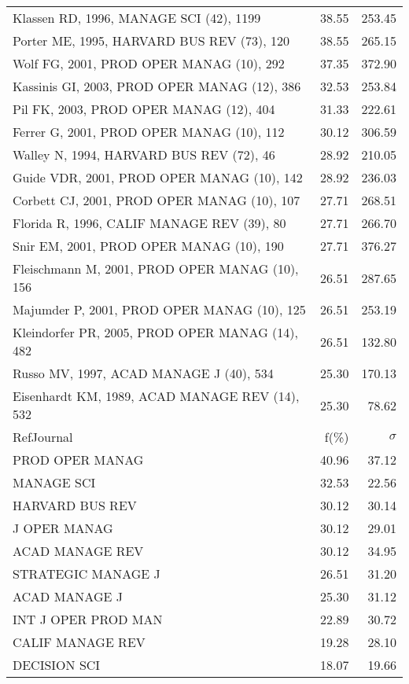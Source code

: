\documentclass[a4paper,11pt]{report}
\begin{document}
\begin{landscape}
\begin{table}[!ht]
{\begin{tabular}{|l r r|}
Klassen RD, 1996, MANAGE SCI (42), 1199 & 38.55 & 253.45\\
Porter ME, 1995, HARVARD BUS REV (73), 120 & 38.55 & 265.15\\
Wolf FG, 2001, PROD OPER MANAG (10), 292 & 37.35 & 372.90\\
Kassinis GI, 2003, PROD OPER MANAG (12), 386 & 32.53 & 253.84\\
Pil FK, 2003, PROD OPER MANAG (12), 404 & 31.33 & 222.61\\
Ferrer G, 2001, PROD OPER MANAG (10), 112 & 30.12 & 306.59\\
Walley N, 1994, HARVARD BUS REV (72), 46 & 28.92 & 210.05\\
Guide VDR, 2001, PROD OPER MANAG (10), 142 & 28.92 & 236.03\\
Corbett CJ, 2001, PROD OPER MANAG (10), 107 & 27.71 & 268.51\\
Florida R, 1996, CALIF MANAGE REV (39), 80 & 27.71 & 266.70\\
Snir EM, 2001, PROD OPER MANAG (10), 190 & 27.71 & 376.27\\
Fleischmann M, 2001, PROD OPER MANAG (10), 156 & 26.51 & 287.65\\
Majumder P, 2001, PROD OPER MANAG (10), 125 & 26.51 & 253.19\\
Kleindorfer PR, 2005, PROD OPER MANAG (14), 482 & 26.51 & 132.80\\
Russo MV, 1997, ACAD MANAGE J (40), 534 & 25.30 & 170.13\\
Eisenhardt KM, 1989, ACAD MANAGE REV (14), 532 & 25.30 & 78.62\\
\hline
\hline
RefJournal & f(\%) & $\sigma$\\
\hline
PROD OPER MANAG & 40.96 & 37.12\\
MANAGE SCI & 32.53 & 22.56\\
HARVARD BUS REV & 30.12 & 30.14\\
J OPER MANAG & 30.12 & 29.01\\
ACAD MANAGE REV & 30.12 & 34.95\\
STRATEGIC MANAGE J & 26.51 & 31.20\\
ACAD MANAGE J & 25.30 & 31.12\\
INT J OPER PROD MAN & 22.89 & 30.72\\
CALIF MANAGE REV & 19.28 & 28.10\\
DECISION SCI & 18.07 & 19.66\\
\hline
\end{tabular}
}
\end{table}


\end{landscape}
\end{document}
